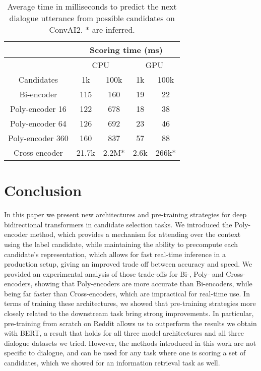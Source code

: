 \documentclass{article} \usepackage{iclr2020_conference,times}
\begin{document}
\begin{table}
\center
\setlength\tabcolsep{4pt}
\begin{tabular}{|c|c|c|c|c|}
\hline
 & \multicolumn{4}{c|}{Scoring time (ms)}\\
\hline
 & \multicolumn{2}{c|}{CPU} & \multicolumn{2}{c|}{GPU}\\
\hline
Candidates & 1k  & 100k& 1k  & 100k \\
\hline
\hline
Bi-encoder & 115 & 160 & 19 & 22\\
\hline
Poly-encoder 16 & 122 & 678 & 18 & 38 \\
\hline
Poly-encoder 64 & 126 & 692 & 23 & 46 \\
\hline
Poly-encoder 360 & 160 & 837 & 57 & 88 \\
\hline
Cross-encoder & 21.7k & 2.2M* & 2.6k & 266k*\\

\hline

\end{tabular}
\caption{Average time in milliseconds to predict the next dialogue utterance from  possible candidates on ConvAI2. * are inferred.}
\label{timing}
\vspace{-1.25em}
\end{table}






\section{Conclusion}
In this paper we present new architectures and pre-training strategies
for deep bidirectional transformers in candidate selection tasks.
We introduced the Poly-encoder method, which provides a mechanism for attending over the context using the label candidate, while maintaining the ability to precompute each candidate's representation, which allows for fast real-time inference in a production setup, giving an improved 
trade off between accuracy and speed. We provided an 
experimental analysis of those trade-offs for Bi-, 
Poly- and
Cross-encoders, showing that Poly-encoders are more accurate than Bi-encoders, 
while being far faster than Cross-encoders, which are impractical for real-time use.
In terms of training these architectures,
we showed that pre-training strategies more closely related to the downstream task bring strong improvements. In particular, 
pre-training from scratch on Reddit allows us to outperform the results we obtain with BERT, 
a result that holds for all three model architectures and all three dialogue datasets we tried.
However, the methods introduced in this work 
are not specific to dialogue, and can be used for any task
where one is scoring a set of candidates, which we showed  
for an information retrieval task as well. 
\end{document}
